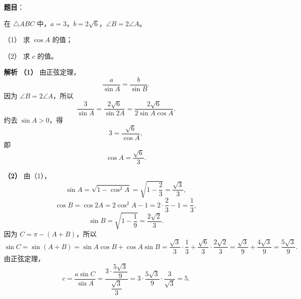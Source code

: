 \begin{answer}

\textbf{题目}：

在 $\triangle ABC$ 中，$a=3$，$b=2\sqrt6$，$\angle B=2\angle A$。

（1） 求 $\cos A$ 的值；

（2） 求 $c$ 的值。

\textbf{解析}
\textbf{（1）} 由正弦定理，
\nopagebreak[4]
\[\frac{a}{\sin A}=\frac{b}{\sin B}.\]
因为 $\angle B=2\angle A$，所以
\nopagebreak[4]
\[\frac{3}{\sin A}=\frac{2\sqrt6}{\sin2A}=\frac{2\sqrt6}{2\sin A\cos A}.\]
约去 $\sin A>0$，得
\nopagebreak[4]
\[3=\frac{\sqrt6}{\cos A},\]
即
\nopagebreak[4]
\[\cos A=\frac{\sqrt6}{3}.\]

\textbf{（2）} 由（1），
\nopagebreak[4]
\[\sin A=\sqrt{1-\cos^2A}=\sqrt{1-\frac23}=\frac{\sqrt3}3,\]
\nopagebreak[4]
\[\cos B=\cos2A=2\cos^2A-1=2\cdot\frac23-1=\frac13,\]
\nopagebreak[4]
\[\sin B=\sqrt{1-\frac19}=\frac{2\sqrt2}3.\]
因为 $C=\pi-(A+B)$，所以
\nopagebreak[4]
\[\sin C=\sin(A+B)=\sin A\cos B+\cos A\sin B
=\frac{\sqrt3}3\cdot\frac13+\frac{\sqrt6}3\cdot\frac{2\sqrt2}3
=\frac{\sqrt3}9+\frac{4\sqrt3}9=\frac{5\sqrt3}9.\]
由正弦定理，
\nopagebreak[4]
\[c=\frac{a\sin C}{\sin A}=\frac{3\cdot\dfrac{5\sqrt3}9}{\dfrac{\sqrt3}3}=3\cdot\frac{5\sqrt3}9\cdot\frac{3}{\sqrt3}=5.\]



\end{answer}
